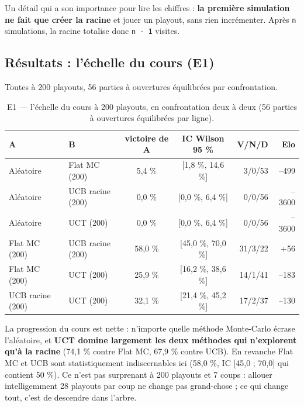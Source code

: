 \documentclass[11pt,a4paper]{article}
\begin{document}
Un détail qui a son importance pour lire les chiffres : \textbf{la première simulation
ne fait que créer la racine} et jouer un playout, sans rien incrémenter. Après
\texttt{n} simulations, la racine totalise donc \texttt{n\ -\ 1} visites.

\subsection{Résultats : l'échelle du cours (E1)}\label{ruxe9sultats-luxe9chelle-du-cours-e1}

Toutes à 200 playouts, 56 parties à ouvertures équilibrées par confrontation.

\begin{table}[htbp]
\centering\small
\caption{E1 --- l'échelle du cours à 200 playouts, en confrontation deux à deux (56 parties à ouvertures équilibrées par ligne).}
\label{tab:e1}
\setlength{\tabcolsep}{5pt}
\begin{tabular}{@{}llccrr@{}}
\toprule
\textbf{A} & \textbf{B} & \textbf{victoire de A} & \textbf{IC Wilson 95 \%} & \textbf{V/N/D} & \textbf{Elo} \\
\midrule
Aléatoire & Flat MC (200) & 5,4 \% & {[}1,8 \%, 14,6 \%{]} & 3/0/53 & --499 \\
Aléatoire & UCB racine (200) & 0,0 \% & {[}0,0 \%, 6,4 \%{]} & 0/0/56 & --3600 \\
Aléatoire & UCT (200) & 0,0 \% & {[}0,0 \%, 6,4 \%{]} & 0/0/56 & --3600 \\
Flat MC (200) & UCB racine (200) & 58,0 \% & {[}45,0 \%, 70,0 \%{]} & 31/3/22 & +56 \\
Flat MC (200) & UCT (200) & 25,9 \% & {[}16,2 \%, 38,6 \%{]} & 14/1/41 & --183 \\
UCB racine (200) & UCT (200) & 32,1 \% & {[}21,4 \%, 45,2 \%{]} & 17/2/37 & --130 \\
\bottomrule
\end{tabular}
\end{table}

La progression du cours est nette : n'importe quelle méthode Monte-Carlo écrase
l'aléatoire, et \textbf{UCT domine largement les deux méthodes qui n'explorent qu'à la
racine} (74,1 \% contre Flat MC, 67,9 \% contre UCB). En revanche Flat MC et UCB
sont statistiquement indiscernables ici (58,0 \%, IC {[}45,0 ; 70,0{]} qui contient
50 \%). Ce n'est pas surprenant à 200 playouts et 7 coups : allouer intelligemment
28 playouts par coup ne change pas grand-chose ; ce qui change tout, c'est de
descendre dans l'arbre.
\end{document}
